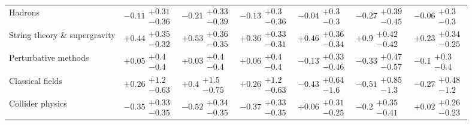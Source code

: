 \begin{tabular}{lllllll}
\hline Hadrons                                   &       $-0.11\substack{+0.31 \\ -0.36}$ &       $-0.21\substack{+0.33 \\ -0.39}$ &        $-0.13\substack{+0.3 \\ -0.36}$ &         $-0.04\substack{+0.3 \\ -0.3}$ &       $-0.27\substack{+0.39 \\ -0.45}$ &         $-0.06\substack{+0.3 \\ -0.3}$ \\
String theory \& supergravity             &  $\bm{+0.44}\substack{+0.35 \\ -0.32}$ &  $\bm{+0.53}\substack{+0.36 \\ -0.35}$ &  $\bm{+0.36}\substack{+0.33 \\ -0.31}$ &  $\bm{+0.46}\substack{+0.36 \\ -0.34}$ &   $\bm{+0.9}\substack{+0.42 \\ -0.42}$ &       $+0.23\substack{+0.34 \\ -0.25}$ \\
Perturbative methods                      &         $+0.05\substack{+0.4 \\ -0.4}$ &         $+0.03\substack{+0.4 \\ -0.4}$ &         $+0.06\substack{+0.4 \\ -0.4}$ &       $-0.13\substack{+0.33 \\ -0.46}$ &       $-0.33\substack{+0.47 \\ -0.57}$ &          $-0.1\substack{+0.3 \\ -0.4}$ \\
Classical fields                          &        $+0.26\substack{+1.2 \\ -0.63}$ &         $+0.4\substack{+1.5 \\ -0.75}$ &        $+0.26\substack{+1.2 \\ -0.63}$ &        $-0.43\substack{+0.64 \\ -1.6}$ &        $-0.51\substack{+0.85 \\ -1.3}$ &        $-0.27\substack{+0.48 \\ -1.2}$ \\
Collider physics                          &  $\bm{-0.35}\substack{+0.33 \\ -0.35}$ &  $\bm{-0.52}\substack{+0.34 \\ -0.35}$ &  $\bm{-0.37}\substack{+0.33 \\ -0.35}$ &       $+0.06\substack{+0.31 \\ -0.25}$ &        $-0.2\substack{+0.35 \\ -0.41}$ &       $+0.02\substack{+0.26 \\ -0.23}$ \\

\end{tabular}
